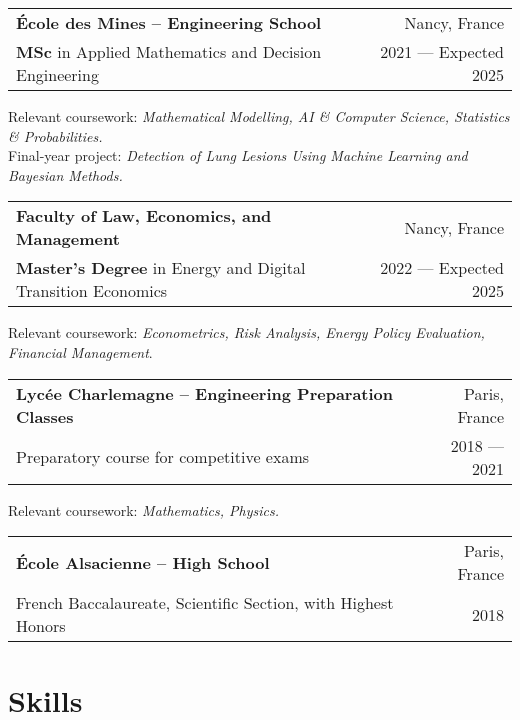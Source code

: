 \documentclass[a4paper,9pt]{extarticle}
\begin{document}
\begin{tabularx}{\textwidth}{@{}Xr@{}}
\textbf{École des Mines -- Engineering School} & Nancy, France\\
\textbf{MSc} in Applied Mathematics and Decision Engineering & 2021 — Expected 2025\\
\end{tabularx}
Relevant coursework: \textit{Mathematical Modelling, AI \& Computer Science, Statistics \& Probabilities.} \\
Final-year project: \textit{Detection of Lung Lesions Using Machine Learning and Bayesian Methods.}

\vspace{5pt} %
\noindent
\begin{tabularx}{\textwidth}{@{}Xr@{}}
\textbf{Faculty of Law, Economics, and Management} & Nancy, France\\
\textbf{Master’s Degree} in Energy and Digital Transition Economics & 2022 — Expected 2025\\
\end{tabularx}
Relevant coursework: \textit{Econometrics, Risk Analysis, Energy Policy Evaluation, Financial Management}.

\vspace{5pt} %
\noindent
\begin{tabularx}{\textwidth}{@{}Xr@{}}
\textbf{Lycée Charlemagne -- Engineering Preparation Classes} & Paris, France\\
Preparatory course for competitive exams & 2018 — 2021\\
\end{tabularx}
Relevant coursework: \textit{Mathematics, Physics.}

\vspace{5pt} %
\noindent
\begin{tabularx}{\textwidth}{@{}Xr@{}}
\textbf{École Alsacienne -- High School} & Paris, France\\
French Baccalaureate, Scientific Section, with Highest Honors & 2018\\
\end{tabularx}

\vspace{6pt}

\section*{\faCogs \hspace{0.1em} Skills}
\end{document}
